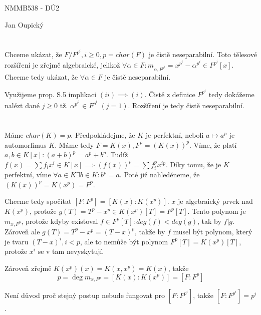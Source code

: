 \documentclass[12pt, a4paper]{article}
\begin{document}
\begin{center}
\large NMMB538 - DÚ2

\normalsize Jan Oupický
\end{center}
\vspace{1\baselineskip}

\section{}
Chceme ukázat, že $F/F^{p^i}, i \geq 0, p = char(F)$ je čistě neseparabilní. Toto tělesové rozšíření je zřejmě algebraické, jelikož $\forall \alpha \in F: m_{\alpha,F^{p^i}} = x^{p^i} - \alpha^{p^i} \in F^{p^i}[x]$. Chceme tedy ukázat, že $\forall \alpha \in F$ je čistě neseparabilní. 

Využijeme prop. S.5 implikaci $(ii) \implies (i)$. Čistě z definice $F^{p^i}$ tedy dokážeme nalézt dané $j \geq 0$ tž. $\alpha^{p^{i^{j}}} \in F^{p^i}$ $(j = 1)$. Rozšíření je tedy čistě neseparabilní.

\section{}
Máme $char(K) = p$. Předpokládejme, že $K$ je perfektní, neboli $a \mapsto a^p$ je automorfimus $K$. Máme tedy $F = K(x), F^p = (K(x))^p$. Víme, že platí $a,b \in K[x]: (a+b)^p = a^p + b^p$. Tudíž $f(x) = \sum f_ix^i \in K[x] \implies (f(x))^p = \sum f_i^p x^{ip}$. Díky tomu, že je $K$ perfektní, víme $\forall a \in K \exists b \in K: b^p = a$. Poté již nahledéneme, že $(K(x))^p = K(x^p) = F^p$.

Chceme tedy spočítat $[F:F^p]=[K(x):K(x^p)]$. $x$ je algebraický prvek nad $K(x^p)$, protože $g(T) = T^p - x^p \in K(x^p)[T] = F^p[T]$. Tento polynom je $m_{x,F^p}$, protože kdyby existoval $f \in F^p[T]: deg(f) < deg(g)$, tak by $f|g$. Zároveň ale $g(T)=T^p - x^p = (T-x)^p$, takže by $f$ musel být polynom, který je tvaru $(T-x)^i, i < p$, ale to nemůže být polynom $F^p[T]=K(x^p)[T]$, protože $x^i$ se v tam nevyskytují.

Zároveň zřejmě $K(x^p)(x)=K(x,x^p)=K(x)$, takže 
\[
p = \deg m_{x,F^p} = [K(x):K(x^p)] = [F:F^p]
\]

Není důvod proč stejný postup nebude fungovat pro $[F:F^{p^i}]$, takže $[F:F^{p^i}] = p^i$.
\end{document}

